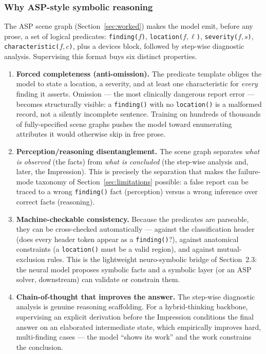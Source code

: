 \documentclass[11pt,a4paper]{article}
\begin{document}
\subsubsection{Why ASP-style symbolic reasoning}
The ASP scene graph (Section~\ref{sec:worked}) makes the model emit, before any prose, a set of logical predicates: \texttt{finding($f$)}, \texttt{location($f,\ell$)}, \texttt{severity($f,s$)}, \texttt{characteristic($f,c$)}, plus a devices block, followed by step-wise diagnostic analysis. Supervising this format buys six distinct properties.
\begin{enumerate}[leftmargin=1.6em]
  \item \textbf{Forced completeness (anti-omission).} The predicate template obliges the model to state a location, a severity, and at least one characteristic for \emph{every} finding it asserts. Omission --- the most clinically dangerous report error --- becomes structurally visible: a \texttt{finding()} with no \texttt{location()} is a malformed record, not a silently incomplete sentence. Training on hundreds of thousands of fully-specified scene graphs pushes the model toward enumerating attributes it would otherwise skip in free prose.
  \item \textbf{Perception/reasoning disentanglement.} The scene graph separates \emph{what is observed} (the facts) from \emph{what is concluded} (the step-wise analysis and, later, the Impression). This is precisely the separation that makes the failure-mode taxonomy of Section~\ref{sec:limitations} possible: a false report can be traced to a wrong \texttt{finding()} fact (perception) versus a wrong inference over correct facts (reasoning).
  \item \textbf{Machine-checkable consistency.} Because the predicates are parseable, they can be cross-checked automatically --- against the classification header (does every header token appear as a \texttt{finding()}?), against anatomical constraints (a \texttt{location()} must be a valid region), and against mutual-exclusion rules. This is the lightweight neuro-symbolic bridge of Section~2.3: the neural model proposes symbolic facts and a symbolic layer (or an ASP solver, downstream) can validate or constrain them.
  \item \textbf{Chain-of-thought that improves the answer.} The step-wise diagnostic analysis is genuine reasoning scaffolding. For a hybrid-thinking backbone, supervising an explicit derivation before the Impression conditions the final answer on an elaborated intermediate state, which empirically improves hard, multi-finding cases --- the model ``shows its work'' and the work constrains the conclusion.

\end{enumerate}
\end{document}
